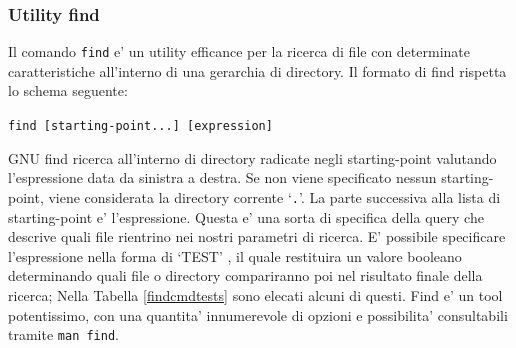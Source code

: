 \subsubsection{Utility \textbf{find}}\label{findcmd}
Il comando \texttt{find} e' un utility efficance per la ricerca di file con determinate caratteristiche all'interno di una gerarchia di directory. Il formato di find rispetta lo schema seguente:
\begin{center}
	\texttt{find [starting-point...] [expression]}
\end{center}
GNU find ricerca all'interno di directory radicate negli starting-point valutando l'espressione data da sinistra a destra. Se non viene specificato nessun starting-point, viene considerata la directory corrente `\texttt{.}'. La parte successiva alla lista di starting-point e' l'espressione. Questa e' una sorta di specifica della query che descrive quali file rientrino nei nostri parametri di ricerca. E' possibile specificare l'espressione nella forma di `TEST' , il quale restituira un valore booleano determinando quali file o directory compariranno poi nel risultato finale della ricerca; Nella Tabella \ref{findcmdtests} sono elecati alcuni di questi. Find e' un tool potentissimo, con una quantita' innumerevole di opzioni e possibilita' consultabili tramite \texttt{man find}.
\renewcommand{\arraystretch}{1.5}

